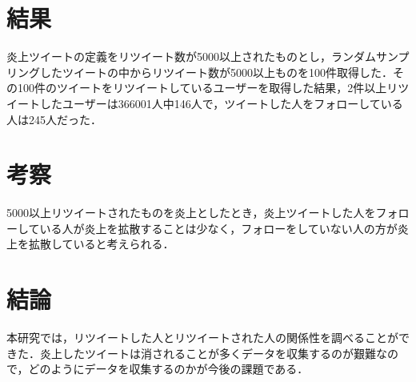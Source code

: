 \documentclass[uplatex,twocolumn,dvipdfmx]{jsarticle}
\begin{document}
\section{結果}
炎上ツイートの定義をリツイート数が5000以上されたものとし，ランダムサンプリングしたツイートの中からリツイート数が5000以上ものを100件取得した．その100件のツイートをリツイートしているユーザーを取得した結果，2件以上リツイートしたユーザーは366001人中146人で，ツイートした人をフォローしている人は245人だった．

\section{考察}
5000以上リツイートされたものを炎上としたとき，炎上ツイートした人をフォローしている人が炎上を拡散することは少なく，フォローをしていない人の方が炎上を拡散していると考えられる．

\section{結論}
本研究では，リツイートした人とリツイートされた人の関係性を調べることができた．炎上したツイートは消されることが多くデータを収集するのが艱難なので，どのようにデータを収集するのかが今後の課題である．



\end{document}
